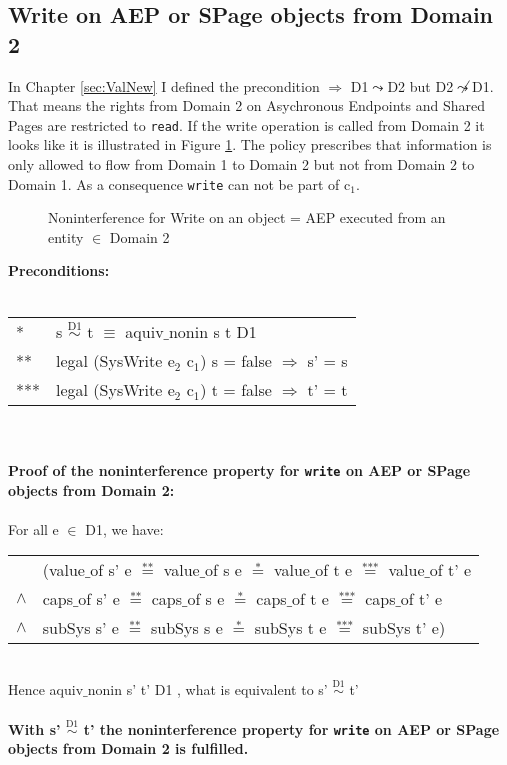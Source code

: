 \subsection{Write on AEP or SPage objects from Domain 2}\label{WriteOut}
In Chapter \ref{sec:ValNew} I defined the precondition $\Rightarrow$ D1$\leadsto$D2 but D2$\not\leadsto$D1. That means the rights from Domain 2 on Asychronous Endpoints and Shared Pages are restricted to \texttt{read}. 
If the write operation is called from Domain 2 it looks like it is illustrated in Figure \ref{fig:WriteOut1}. The policy prescribes that information is only allowed to flow from Domain 1 to Domain 2 but not from Domain 2 to Domain 1. As a consequence \texttt{write} can not be part of c$_1$. 
\begin{figure}[H]
\caption{Noninterference for Write on an object = AEP executed from an entity $\in$ Domain 2}
\label{fig:WriteOut1}
\end{figure}
\textbf{Preconditions:} \\ \\
\begin{tabular}{ll}
* & s $\overset{\text{D1}}{\sim}$ t $\equiv$ aquiv$\_$nonin s t D1	\\ 
** & legal (SysWrite e$_2$ c$_1$) s = false $\Rightarrow$ s' = s \\ 
*** & legal (SysWrite e$_2$ c$_1$) t = false $\Rightarrow$ t' = t
\end{tabular} \\ \\ 
\textbf{Proof of the noninterference property for \texttt{write} on AEP or SPage objects from Domain 2:}\\ \\
For all e $\in$ D1, we have: \\ 
\begin{tabular}{ll}
& (value$\_$of s' e $\overset{\text{**}}{=}$ value$\_$of s e $\overset{\text{*}}{=}$ value$\_$of t e $\overset{\text{***}}{=}$ value$\_$of t' e \\
$\wedge$ & caps$\_$of s' e $\overset{\text{**}}{=}$ caps$\_$of s e $\overset{\text{*}}{=}$ caps$\_$of t e $\overset{\text{***}}{=}$ caps$\_$of t' e \\
$\wedge$ & subSys s' e $\overset{\text{**}}{=}$ subSys s e $\overset{\text{*}}{=}$ subSys t e $\overset{\text{***}}{=}$ subSys t' e)
\end{tabular} \\
Hence aquiv$\_$nonin s' t' D1 , what is equivalent to s' $\overset{\text{D1}}{\sim}$ t'\\ \\ 
\textbf{With s' $\overset{\text{D1}}{\sim}$ t' the noninterference property for \texttt{write} on AEP or SPage objects from Domain 2 is fulfilled.}  
\clearpage

